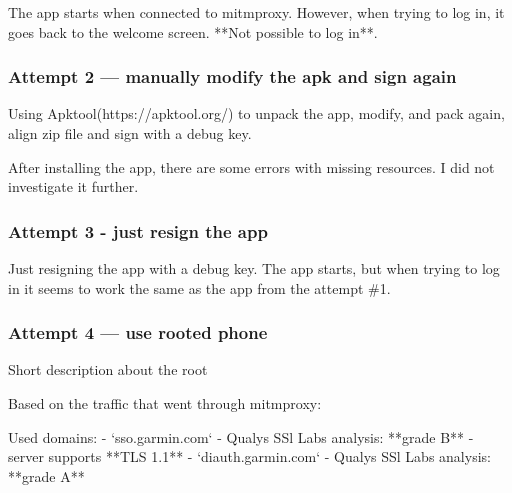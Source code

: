 The app starts when connected to mitmproxy.
However, when trying to log in, it goes back to the welcome screen.
**Not possible to log in**.
\subsubsection{Attempt 2 — manually modify the apk and sign again}
Using Apktool(https://apktool.org/) to unpack the app, modify, and pack again, align zip file and sign with a debug key.

After installing the app, there are some errors with missing resources.
I did not investigate it further.
\subsubsection{Attempt 3 - just resign the app}
Just resigning the app with a debug key.
The app starts, but when trying to log in it seems to work the same as the app from the attempt \#1.
\subsubsection{Attempt 4 — use rooted phone}
Short description about the root

Based on the traffic that went through mitmproxy:

Used domains:
- `sso.garmin.com` - Qualys SSl Labs analysis: **grade B**
- server supports **TLS 1.1**
- `diauth.garmin.com` - Qualys SSl Labs analysis: **grade A**

